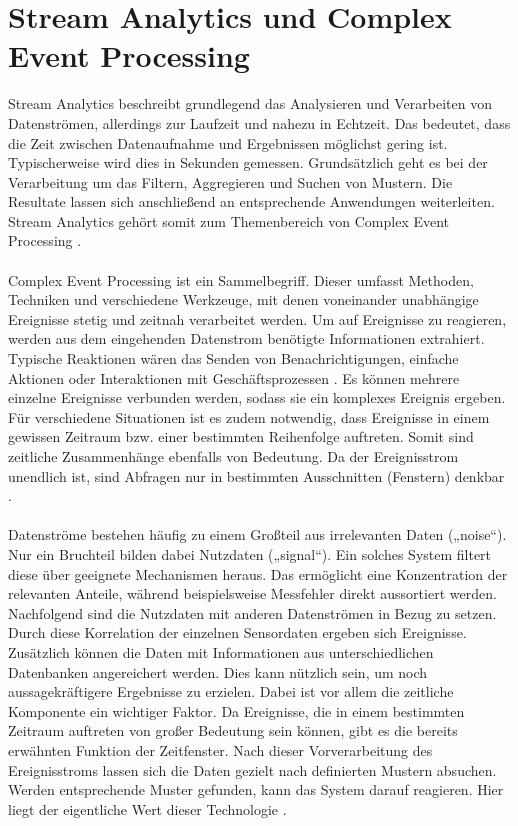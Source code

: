 \section{Stream Analytics und Complex Event Processing}
Stream Analytics beschreibt grundlegend das Analysieren und Verarbeiten von Datenströmen, allerdings zur Laufzeit und nahezu in Echtzeit. Das bedeutet, dass die Zeit zwischen Datenaufnahme und Ergebnissen möglichst gering ist. Typischerweise wird dies in Sekunden gemessen. Grundsätzlich geht es bei der Verarbeitung um das Filtern, Aggregieren und Suchen von Mustern. Die Resultate lassen sich anschließend an entsprechende Anwendungen weiterleiten. Stream Analytics gehört somit zum Themenbereich von Complex Event Processing \cite{GesellschaftfurInformatik.2009}.\\ \\ 
Complex Event Processing ist ein Sammelbegriff. Dieser umfasst Methoden, Techniken und verschiedene Werkzeuge, mit denen voneinander unabhängige Ereignisse stetig und zeitnah verarbeitet werden. Um auf Ereignisse zu reagieren, werden aus dem eingehenden Datenstrom benötigte Informationen extrahiert. Typische Reaktionen wären das Senden von Benachrichtigungen, einfache Aktionen oder Interaktionen mit Geschäftsprozessen \cite{GesellschaftfurInformatik.2009}. Es können mehrere einzelne Ereignisse verbunden werden, sodass sie ein komplexes Ereignis ergeben. Für verschiedene Situationen ist es zudem notwendig, dass Ereignisse in einem gewissen Zeitraum bzw. einer bestimmten Reihenfolge auftreten. Somit sind zeitliche Zusammenhänge ebenfalls von Bedeutung. Da der Ereignisstrom unendlich ist, sind Abfragen nur in bestimmten Ausschnitten (Fenstern) denkbar \cite{GesellschaftfurInformatik.2009}. \\ \\
Datenströme bestehen häufig zu einem Großteil aus irrelevanten Daten („noise“). Nur ein Bruchteil bilden dabei Nutzdaten („signal“). Ein solches System filtert diese über geeignete Mechanismen heraus. Das ermöglicht eine Konzentration der relevanten Anteile, während beispielsweise Messfehler direkt aussortiert werden. Nachfolgend sind die Nutzdaten mit anderen Datenströmen in Bezug zu setzen. Durch diese Korrelation der einzelnen Sensordaten ergeben sich Ereignisse. Zusätzlich können die Daten mit Informationen aus unterschiedlichen Datenbanken angereichert werden. Dies kann nützlich sein, um noch aussagekräftigere Ergebnisse zu erzielen. Dabei ist vor allem die zeitliche Komponente ein wichtiger Faktor. Da Ereignisse, die in einem bestimmten Zeitraum auftreten von großer Bedeutung sein können, gibt es die bereits erwähnten Funktion der Zeitfenster. Nach dieser Vorverarbeitung des Ereignisstroms lassen sich die Daten gezielt nach definierten Mustern absuchen. Werden entsprechende Muster gefunden, kann das System darauf reagieren. Hier liegt der eigentliche Wert dieser Technologie \cite{Bruening.2016}.



\ifCLASSOPTIONcaptionsoff
  \newpage
\fi